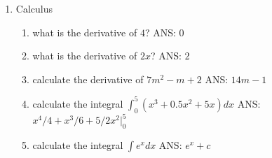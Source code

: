 \documentclass[11pt]{article}
\begin{document}
\begin{enumerate}
\begin{enumerate}
\begin{enumerate}
\color{black}
\end{enumerate}


\end{enumerate}

\item Calculus 
\begin{enumerate}
\item what is the derivative of $4$? \color{gray} ANS: $0$ \color{black} \\
\item what is the derivative of $2x$?  \color{gray} ANS: $2$ \color{black} \\
\item calculate the derivative of $7m^2-m+2$  \color{gray} ANS: $14m-1$ \color{black}\\
\item calculate the integral $\int_{0}^{5}  (x^3+0.5x^2+5x)dx$  \color{gray} ANS: $x^4/4+x^3/6+5/2x^2|_0^5$\color{black}\\
\item calculate the integral $\int e^x dx$  \color{gray} ANS: $e^x+c$ \color{black} \\
\end{enumerate}



\end{enumerate} 
\end{document}
